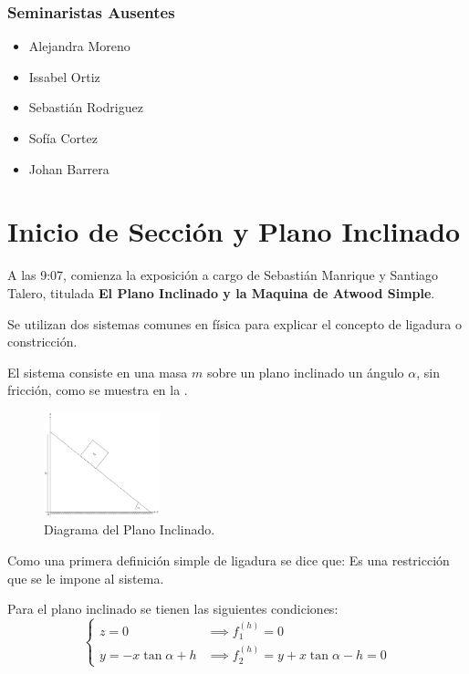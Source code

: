 \documentclass{article}
\theoremstyle{definition}
\begin{document}
\subsubsection{Seminaristas Ausentes}
\begin{itemize}
	\item Alejandra Moreno
	\item Issabel Ortiz
	\item Sebastián Rodriguez
	\item Sofía Cortez
	\item Johan Barrera
\end{itemize}

\section{Inicio de Sección y Plano Inclinado}
A las 9:07, comienza la exposición a cargo de Sebastián Manrique y Santiago Talero, titulada \textbf{El Plano Inclinado y la Maquina de Atwood Simple}.

Se utilizan dos sistemas comunes en física para explicar el concepto de ligadura o constricción.

El sistema consiste en una masa $m$ sobre un plano inclinado un ángulo $\alpha$, sin fricción, como se muestra en la .

\begin{figure}[H]
	\centering
	\includegraphics[width=0.30\textwidth]{./Images/inclined-plane.pdf}
	\caption{Diagrama del Plano Inclinado.}
	\label{fig:inclained_plane}
\end{figure}

Como una primera definición simple de ligadura se dice que: Es una restricción que se le impone al sistema.

Para el plano inclinado se tienen las siguientes condiciones:
\begin{equation}
	\begin{cases}
		z = 0 &\implies f_1^{(h)} = 0 \\
		y = -x\tan{\alpha} + h &\implies f_2^{(h)} = y + x\tan{\alpha} - h = 0
	\end{cases}
\end{equation}
\end{document}
